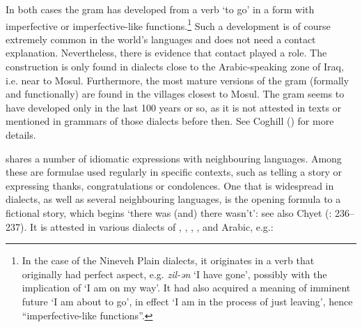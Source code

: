 \documentclass[output=paper]{langsci/langscibook}
\begin{document}
In both cases the gram has developed from a verb ‘to go’ in a form with imperfective or imperfective-like functions.\footnote{In the case of the Nineveh Plain dialects, it originates in a verb that originally had perfect aspect, e.g. \textit{zil-ən} ‘I have gone’, possibly with the implication of ‘I am on my way’. It had also acquired a meaning of imminent {future} ‘I am about to go’, in effect ‘I am in the process of just leaving’, hence ``imperfective-like functions''.} Such a development is of course extremely common in the world’s languages and does not need a contact explanation. Nevertheless, there is evidence that contact played a role. The construction is only found in  dialects close to the Arabic-speaking zone of Iraq, i.e. near to Mosul. Furthermore, the most mature versions of the gram (formally and functionally) are found in the villages closest to Mosul. The gram seems to have developed only in the last 100 years or so, as it is not attested in texts or mentioned in grammars of those dialects before then. See Coghill (\citeyear{Coghill2010,Coghill2012}) for more details.

 shares a number of {idiomatic} expressions with neighbouring languages. Among these are formulae used regularly in specific contexts, such as telling a story or expressing thanks, congratulations or condolences. One that is widespread in  dialects, as well as several neighbouring languages, is the opening formula to a fictional story, which begins ‘there was (and) there wasn’t’: see also Chyet (\citeyear{Chyet1995}: 236–237). It is attested in various dialects of , , , ,  and Arabic, e.g.:
\end{document}
